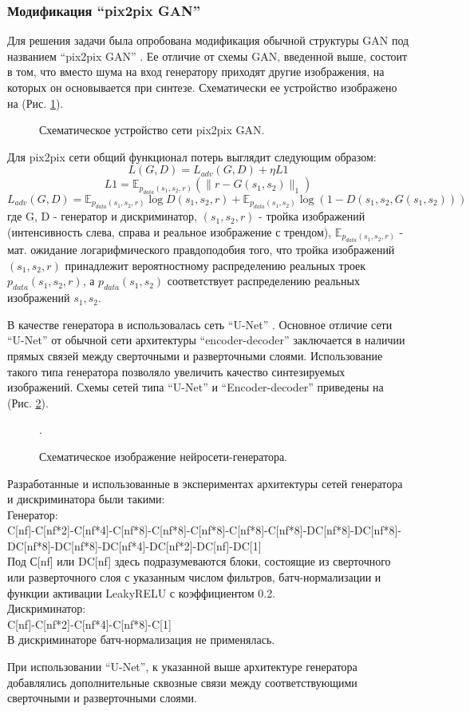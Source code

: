 		\subsubsection{Модификация ``pix2pix GAN''}
			Для решения задачи была опробована модификация обычной структуры GAN под названием ``pix2pix GAN'' \cite{pix2pix, p2p-vessnet}. Ее отличие от схемы GAN, введенной выше, состоит в том, что вместо шума на вход генератору приходят другие изображения, на которых он основывается при синтезе. Схематически ее устройство изображено на (Рис. \ref{5-p2p}).
	
			\begin{figure}[h!]
				\caption{Схематическое устройство сети pix2pix GAN.}
				\label{5-p2p}
			\end{figure}
	
			Для pix2pix сети общий функционал потерь выглядит следующим образом: $$ L(G, D) = L_{adv}(G, D) + \eta L1$$
			$$L1 = \mathbb{E}_{p_{data}(s_1, s_2, r)} (\parallel r - G(s_1, s_2) \parallel_1)$$
			$$ L_{adv}(G, D) = \mathbb{E}_{p_{data}(s_1, s_2, r)}\log D(s_1, s_2, r) +  \mathbb{E}_{p_{data}(s_1, s_2)} \log (1 - D(s_1, s_2, G(s_1, s_2)))$$
			где G, D - генератор и дискриминатор, $(s_1, s_2, r)$ - тройка изображений (интенсивность слева, справа и реальное изображение с трендом),  $\mathbb{E}_{p_{data}(s_1, s_2, r)}$ - мат. ожидание логарифмического правдоподобия того, что тройка изображений $(s_1, s_2, r)$ принадлежит вероятностному распределению реальных троек $p_{data}(s_1, s_2, r)$, а $p_{data}(s_1, s_2)$ соответствует распределению реальных изображений $s_1, s_2$.
	
			В качестве генератора в \cite{pix2pix, p2p-vessnet} использовалась сеть ``U-Net'' \cite{unet}. Основное отличие сети ``U-Net'' от обычной сети архитектуры ``encoder-decoder'' заключается в наличии прямых связей между сверточными и разверточными слоями. Использование такого типа генератора позволяло увеличить качество синтезируемых изображений. Схемы сетей типа ``U-Net'' и ``Encoder-decoder'' приведены на (Рис. \ref{5-unet-sheme}).
			
			\begin{figure}[h!]
				\caption{Схематическое изображение нейросети-генератора.}
				\label{5-unet-sheme}.
			\end{figure}
			
			Разработанные и использованные в экспериментах архитектуры сетей генератора и дискриминатора были такими:\\
			Генератор:\\ C[nf]-C[nf*2]-C[nf*4]-C[nf*8]-C[nf*8]-C[nf*8]-C[nf*8]-C[nf*8]-DC[nf*8]-DC[nf*8]-DC[nf*8]-DC[nf*8]-DC[nf*4]-DC[nf*2]-DC[nf]-DC[1]\\
			Под С[nf] или DC[nf] здесь подразумеваются блоки, состоящие из сверточного или разверточного слоя с указанным числом фильтров, батч-нормализации и функции активации LeakyRELU с коэффициентом 0.2.\\
			Дискриминатор:\\
			C[nf]-C[nf*2]-C[nf*4]-C[nf*8]-C[1]\\
			В дискриминаторе батч-нормализация не применялась.
			
			При использовании ``U-Net'', к указанной выше архитектуре генератора добавлялись дополнительные сквозные связи между соответствующими сверточными и разверточными слоями.